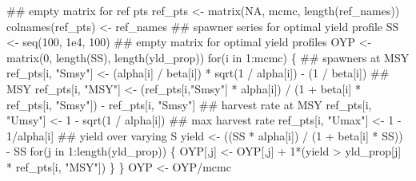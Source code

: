 \documentclass[
  11pt,
]{article}
\newenvironment{Shaded}{}{}
\newcommand{\CommentTok}[1]{\textcolor[rgb]{0.00,0.50,0.00}{#1}}
\newcommand{\ControlFlowTok}[1]{\textcolor[rgb]{0.00,0.00,1.00}{#1}}
\newcommand{\DecValTok}[1]{#1}
\newcommand{\FloatTok}[1]{#1}
\newcommand{\KeywordTok}[1]{\textcolor[rgb]{0.00,0.00,1.00}{#1}}
\newcommand{\NormalTok}[1]{#1}
\newcommand{\OperatorTok}[1]{#1}
\newcommand{\OtherTok}[1]{\textcolor[rgb]{1.00,0.25,0.00}{#1}}
\newcommand{\StringTok}[1]{\textcolor[rgb]{0.00,0.50,0.50}{#1}}
\begin{document}
\begin{Shaded}
\begin{Highlighting}[]
\CommentTok{## empty matrix for ref pts}
\NormalTok{ref_pts <-}\StringTok{ }\KeywordTok{matrix}\NormalTok{(}\OtherTok{NA}\NormalTok{, mcmc, }\KeywordTok{length}\NormalTok{(ref_names))}
\KeywordTok{colnames}\NormalTok{(ref_pts) <-}\StringTok{ }\NormalTok{ref_names}
\CommentTok{## spawner series for optimal yield profile}
\NormalTok{SS <-}\StringTok{ }\KeywordTok{seq}\NormalTok{(}\DecValTok{100}\NormalTok{, }\FloatTok{1e4}\NormalTok{, }\DecValTok{100}\NormalTok{)}
\CommentTok{## empty matrix for optimal yield profiles}
\NormalTok{OYP <-}\StringTok{ }\KeywordTok{matrix}\NormalTok{(}\DecValTok{0}\NormalTok{, }\KeywordTok{length}\NormalTok{(SS), }\KeywordTok{length}\NormalTok{(yld_prop))}
\ControlFlowTok{for}\NormalTok{(i }\ControlFlowTok{in} \DecValTok{1}\OperatorTok{:}\NormalTok{mcmc) \{}
    \CommentTok{## spawners at MSY}
\NormalTok{    ref_pts[i, }\StringTok{"Smsy"}\NormalTok{] <-}\StringTok{ }\NormalTok{(alpha[i] }\OperatorTok{/}\StringTok{ }\NormalTok{beta[i]) }\OperatorTok{*}\StringTok{ }\KeywordTok{sqrt}\NormalTok{(}\DecValTok{1} \OperatorTok{/}\StringTok{ }\NormalTok{alpha[i]) }\OperatorTok{-}\StringTok{ }\NormalTok{(}\DecValTok{1} \OperatorTok{/}\StringTok{ }\NormalTok{beta[i])}
    \CommentTok{## MSY}
\NormalTok{    ref_pts[i, }\StringTok{"MSY"}\NormalTok{] <-}\StringTok{ }\NormalTok{(ref_pts[i,}\StringTok{"Smsy"}\NormalTok{] }\OperatorTok{*}\StringTok{ }\NormalTok{alpha[i]) }\OperatorTok{/}
\StringTok{                            }\NormalTok{(}\DecValTok{1} \OperatorTok{+}\StringTok{ }\NormalTok{beta[i] }\OperatorTok{*}\StringTok{ }\NormalTok{ref_pts[i, }\StringTok{"Smsy"}\NormalTok{]) }\OperatorTok{-}\StringTok{ }\NormalTok{ref_pts[i, }\StringTok{"Smsy"}\NormalTok{]}
    \CommentTok{## harvest rate at MSY}
\NormalTok{    ref_pts[i, }\StringTok{"Umsy"}\NormalTok{] <-}\StringTok{ }\DecValTok{1} \OperatorTok{-}\StringTok{ }\KeywordTok{sqrt}\NormalTok{(}\DecValTok{1} \OperatorTok{/}\StringTok{ }\NormalTok{alpha[i])}
    \CommentTok{## max harvest rate}
\NormalTok{    ref_pts[i, }\StringTok{"Umax"}\NormalTok{] <-}\StringTok{ }\DecValTok{1} \OperatorTok{-}\StringTok{ }\DecValTok{1}\OperatorTok{/}\NormalTok{alpha[i]}
    \CommentTok{## yield over varying S}
\NormalTok{    yield <-}\StringTok{ }\NormalTok{((SS }\OperatorTok{*}\StringTok{ }\NormalTok{alpha[i]) }\OperatorTok{/}\StringTok{ }\NormalTok{(}\DecValTok{1} \OperatorTok{+}\StringTok{ }\NormalTok{beta[i] }\OperatorTok{*}\StringTok{ }\NormalTok{SS)) }\OperatorTok{-}\StringTok{ }\NormalTok{SS}
    \ControlFlowTok{for}\NormalTok{(j }\ControlFlowTok{in} \DecValTok{1}\OperatorTok{:}\KeywordTok{length}\NormalTok{(yld_prop)) \{}
\NormalTok{        OYP[,j] <-}\StringTok{ }\NormalTok{OYP[,j] }\OperatorTok{+}\StringTok{ }\DecValTok{1}\OperatorTok{*}\NormalTok{(yield }\OperatorTok{>}\StringTok{ }\NormalTok{yld_prop[j] }\OperatorTok{*}\StringTok{ }\NormalTok{ref_pts[i, }\StringTok{"MSY"}\NormalTok{])}
\NormalTok{    \}}
\NormalTok{\}}
\NormalTok{OYP <-}\StringTok{ }\NormalTok{OYP}\OperatorTok{/}\NormalTok{mcmc}


\end{Highlighting}
\end{Shaded}
\end{document}
